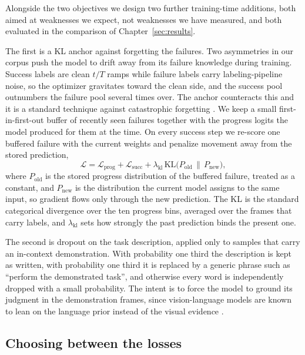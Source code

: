 Alongside the two objectives we design two further training-time additions, both aimed at weaknesses we expect, not weaknesses we have measured, and both evaluated in the comparison of Chapter~\ref{sec:results}.

The first is a KL anchor against forgetting the failures. Two asymmetries in our corpus push the model to drift away from its failure knowledge during training. Success labels are clean $t/T$ ramps while failure labels carry labeling-pipeline noise, so the optimizer gravitates toward the clean side, and the success pool outnumbers the failure pool several times over. The anchor counteracts this and it is a standard technique against catastrophic forgetting \citep{kirkpatrick_overcoming_2016, li_learning_2016}. We keep a small first-in-first-out buffer of recently seen failures together with the progress logits the model produced for them at the time. On every success step we re-score one buffered failure with the current weights and penalize movement away from the stored prediction,
\begin{equation}
\mathcal{L} = \mathcal{L}_{\mathrm{prog}} + \mathcal{L}_{\mathrm{succ}}
+ \lambda_{\mathrm{kl}}\, \mathrm{KL}\!\big(P_{\mathrm{old}} \,\|\, P_{\mathrm{new}}\big),
\label{eq:kl-anchor}
\end{equation}
where $P_{\mathrm{old}}$ is the stored progress distribution of the buffered failure, treated as a constant, and $P_{\mathrm{new}}$ is the distribution the current model assigns to the same input, so gradient flows only through the new prediction. The KL is the standard categorical divergence over the ten progress bins, averaged over the frames that carry labels, and $\lambda_{\mathrm{kl}}$ sets how strongly the past prediction binds the present one.

The second is dropout on the task description, applied only to samples that carry an in-context demonstration. With probability one third the description is kept as written, with probability one third it is replaced by a generic phrase such as ``perform the demonstrated task'', and otherwise every word is independently dropped with a small probability. The intent is to force the model to ground its judgment in the demonstration frames, since vision-language models are known to lean on the language prior instead of the visual evidence \citep{goyal_making_2017}.

\subsection{Choosing between the losses}

